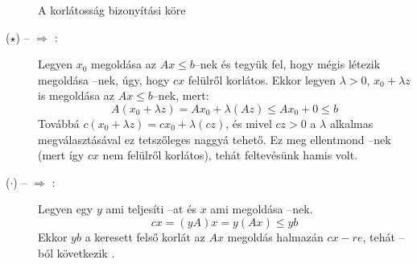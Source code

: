 \begin{figure}[htbp]
\caption{A korlátosság bizonyítási köre}
\label{fig:KorBizKor}
\centering {} 
\end{figure}            
\begin{description}
  \item[($\star$) --  $\Rightarrow$ :]  Legyen $x_0$
  megoldása az $Ax \leq b$--nek és tegyük fel, hogy mégis létezik megoldása
  --nek, úgy, hogy $cx$ felülről korlátos. Ekkor legyen $\lambda >
  0$, $x_0 + \lambda z$ is megoldása az $Ax \leq b$--nek, mert:
  \[ A(x_0+ \lambda z) = Ax_0 + \lambda (Az) \leq A x_0 + 0 \leq b \] Továbbá
  $c(x_0 + \lambda z ) = c x_0 + \lambda (cz)$, és mivel $cz>0$ a $\lambda$
  alkalmas megválasztásával ez tetszőleges naggyá tehető. Ez meg ellentmond
  --nek (mert így $cx$ nem felülről korlátos), tehát feltevésünk
  hamis volt.
  \item[($\cdot$) --  $\Rightarrow$ :]  Legyen egy $y$
  ami teljesíti --at és $x$ ami megoldása --nek. 
  \[ cx = (yA)x = y(Ax) \leq yb \]
  Ekkor $yb$ a keresett felső korlát az $Ax$ megoldás halmazán $cx-re$, tehát
  --ból következik .
\end{description}